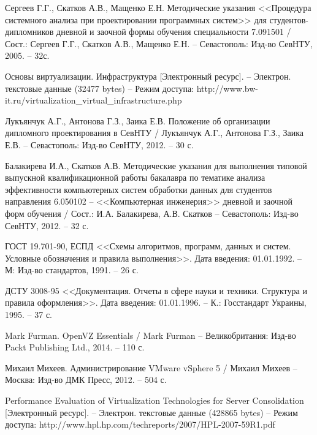 \begin{thebibliography}{00}
    Сергеев Г.Г., Скатков А.В., Мащенко Е.Н.
    Методические указания <<Процедура системного анализа при проектировании программных систем>>
    для студентов-дипломников дневной и заочной формы обучения специальности 7.091501 /
    Сост.: Сергеев Г.Г., Скатков А.В., Мащенко Е.Н. -- Севастополь:
    Изд-во СевНТУ, 2005. -- 32с.

    Основы виртуализации. Инфраструктура
    [Электронный ресурс]. --
    Электрон. текстовые данные (32477 bytes) -- 
    Режим доступа: http://www.bw-it.ru/virtualization\_virtual\_infrastructure.php


 Лукъянчук А.Г., Антонова Г.З., Заика Е.В. 
    Положение об организации дипломного проектирования в СевНТУ / 
    Лукъянчук А.Г., Антонова Г.З., Заика Е.В. -- Севастополь: 
    Изд-во СевНТУ, 2012. -- 30 с.

    Балакирева И.А., Скатков А.В. 
    Методические указания для выполнения типовой выпускной 
    квалификационной работы бакалавра по тематике анализа эффективности 
    компьютерных систем обработки данных для студентов направления 
    6.050102 -- <<Компьютерная инженерия>> дневной и заочной форм обучения / 
    Сост.: И.А. Балакирева, А.В. Скатков -- Севастополь: Изд-во СевНТУ, 2012. -- 32 с.

    ГОСТ 19.701-90, ЕСПД <<Схемы алгоритмов, программ, данных и систем. 
    Условные обозначения и правила выполнения>>. 
    Дата введения: 01.01.1992. -- М: Изд-во стандартов, 1991. -- 26 с.

    ДСТУ 3008-95 <<Документация. Отчеты в сфере науки и техники. 
    Структура и правила оформления>>. 
    Дата введения: 01.01.1996. -- К.: Госстандарт Украины, 1995. -- 37 с.

    Mark Furman. OpenVZ Essentials /
    Mark Furman -- Великобритания: Изд-во Packt Publishing Ltd.,
    2014. -- 110 с.

    Михаил Михеев. Администрирование VMware vSphere 5 / 
    Михаил Михеев -- Москва: Изд-во ДМК Пресс, 
    2012. -- 504 с.
    
    Performance Evaluation of Virtualization Technologies for Server Consolidation
    [Электронный ресурс]. --
    Электрон. текстовые данные (428865 bytes) -- 
    Режим доступа: http://www.hpl.hp.com/techreports/2007/HPL-2007-59R1.pdf


\end{thebibliography}
